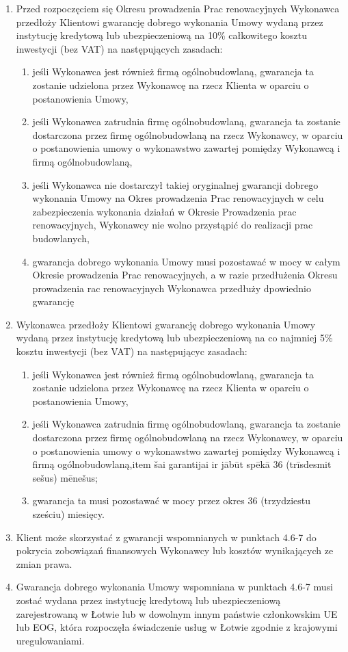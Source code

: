 \begin{multicols}{2}
\begin{enumerate}
	\item Przed rozpoczęciem się Okresu prowadzenia Prac renowacyjnych Wykonawca przedłoży Klientowi gwarancję dobrego wykonania Umowy wydaną przez instytucję kredytową lub ubezpieczeniową na 10\% całkowitego kosztu inwestycji (bez VAT) na następujących zasadach:
	\begin{enumerate}
		\item jeśli Wykonawca jest również firmą ogólnobudowlaną, gwarancja ta zostanie udzielona przez Wykonawcę na rzecz Klienta w oparciu o postanowienia Umowy,
		\item jeśli Wykonawca zatrudnia firmę ogólnobudowlaną, gwarancja ta zostanie dostarczona przez firmę ogólnobudowlaną na rzecz Wykonawcy, w oparciu o postanowienia umowy o wykonawstwo zawartej pomiędzy Wykonawcą i firmą ogólnobudowlaną,
		\item jeśli Wykonawca nie dostarczył takiej oryginalnej gwarancji dobrego wykonania Umowy na Okres prowadzenia Prac renowacyjnych w celu zabezpieczenia wykonania działań w Okresie Prowadzenia prac renowacyjnych, Wykonawcy nie wolno przystąpić do realizacji prac budowlanych,
		\item gwarancja dobrego wykonania Umowy musi pozostawać w mocy w całym Okresie prowadzenia Prac renowacyjnych, a w razie przedłużenia Okresu prowadzenia rac renowacyjnych Wykonawca przedłuży dpowiednio gwarancję
	\end{enumerate}
	\item Wykonawca przedłoży Klientowi gwarancję dobrego wykonania Umowy wydaną przez instytucję kredytową lub ubezpieczeniową na co najmniej 5\% kosztu inwestycji (bez VAT) na następującyc zasadach:
	\begin{enumerate}
		\item jeśli Wykonawca jest również firmą ogólnobudowlaną, gwarancja ta zostanie udzielona przez Wykonawcę na rzecz Klienta w oparciu o postanowienia Umowy,
		\item jeśli Wykonawca zatrudnia firmę ogólnobudowlaną, gwarancja ta zostanie dostarczona przez firmę ogólnobudowlaną na rzecz Wykonawcy, w oparciu o postanowienia umowy o wykonawstwo zawartej pomiędzy Wykonawcą i firmą ogólnobudowlaną,item šai garantijai ir jābūt spēkā 36 (trīsdesmit sešus) mēnešus;
		\item gwarancja ta musi pozostawać w mocy przez okres 36 (trzydziestu sześciu) miesięcy.
	\end{enumerate}
	\item Klient może skorzystać z gwarancji wspomnianych w punktach 4.6-7 do pokrycia zobowiązań finansowych Wykonawcy lub kosztów wynikających ze zmian prawa.
	\item Gwarancja dobrego wykonania Umowy wspomniana w punktach 4.6-7 musi zostać wydana przez instytucję kredytową lub ubezpieczeniową zarejestrowaną w Łotwie lub w dowolnym innym państwie członkowskim UE lub EOG, która rozpoczęła świadczenie usług w Łotwie zgodnie z krajowymi uregulowaniami.
\end{enumerate}


\end{multicols}
